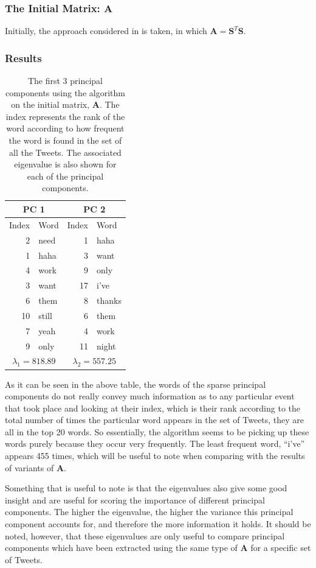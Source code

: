 \documentclass[11pt,a4paper]{article}
\newcommand{\covmat}{\mathbf{A}}
\begin{document}
\subsubsection{The Initial Matrix: $\mathbf{A}$}
Initially, the approach considered in \cite{dimakis} is taken, in which $\mathbf{A} = \mathbf{S}^T \mathbf{S}$. 

\subsubsection*{Results}
\begin{table}[H]
\center
\begin{tabular}{| r| l | r| l |}
\hline
\multicolumn{2}{|c|}{PC 1} & \multicolumn{2}{|c|}{PC 2}
\\
\hline
Index & Word & Index & Word\\
\hline
2 & need & 1 & haha \\
1 & haha & 3 & want \\
4 & work & 9 &only\\
3 & want & 17 & i've\\
6 & them & 8 & thanks\\
10 & still& 6 & them\\ 
7 & yeah & 4 & work\\
9 & only & 11 & night\\
\hline
\multicolumn{2}{|c|}{ $\lambda_1 = 818.89$}  & \multicolumn{2}{|c|}{ $\lambda_2 = 557.25$}  \\
\hline
\end{tabular}
\caption{The first 3 principal components using the algorithm on the initial matrix, $ \mathbf{A}$. The index represents the rank of the word according to how frequent the word is found in the set of all the Tweets. The associated eigenvalue is also shown for each of the principal components.}
\end{table}

As it can be seen in the above table, the words of the sparse principal components do not really convey much information as to any particular event that took place and looking at their index, which is their rank according to the total number of times the particular word appears in the set of Tweets, they are all in the top 20 words. So essentially, the algorithm seems to be picking up these words purely because they occur very frequently. The least frequent word, ``i've'' appears 455 times, which will be useful to note when comparing with the results of variants of $\covmat$.

Something that is useful to note is that the eigenvalues also give some good insight and are useful for scoring the importance of different principal components. The higher the eigenvalue, the higher the variance this principal component accounts for, and therefore the more information it holds. It should be noted, however, that these eigenvalues are only useful to compare principal components which have been extracted using the same type of $\covmat$ for a specific set of Tweets.
\end{document}
